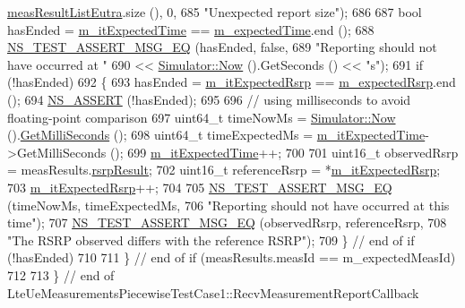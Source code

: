 \begin{DoxyCode}
      \hyperlink{structns3_1_1LteRrcSap_1_1MeasResults_a1fc2cdef154508dd522b46c71f854f03}{measResultListEutra}.size (), 0,
685                              \textcolor{stringliteral}{"Unexpected report size"});
686 
687       \textcolor{keywordtype}{bool} hasEnded = \hyperlink{classLteUeMeasurementsPiecewiseTestCase1_a6b6edd027bcc1219f66b88a318672dca}{m\_itExpectedTime} == \hyperlink{classLteUeMeasurementsPiecewiseTestCase1_a1906d2a638148579c52d6dcf370b84a2}{m\_expectedTime}.end ();
688       \hyperlink{group__testing_ga2a9d78cffb3db8e867c35fff0b698cf5}{NS\_TEST\_ASSERT\_MSG\_EQ} (hasEnded, \textcolor{keyword}{false},
689                              \textcolor{stringliteral}{"Reporting should not have occurred at "}
690                              << \hyperlink{group__simulator_gac3635e2e87f7ce316c89290ee1b01d0d}{Simulator::Now} ().GetSeconds () << \textcolor{stringliteral}{"s"});
691       \textcolor{keywordflow}{if} (!hasEnded)
692         \{
693           hasEnded = \hyperlink{classLteUeMeasurementsPiecewiseTestCase1_ad0362797e90952c7ffd619a9aa59309b}{m\_itExpectedRsrp} == \hyperlink{classLteUeMeasurementsPiecewiseTestCase1_abac81553dc6e6c5f9a0721a609647753}{m\_expectedRsrp}.end ();
694           \hyperlink{assert_8h_a6dccdb0de9b252f60088ce281c49d052}{NS\_ASSERT} (!hasEnded);
695 
696           \textcolor{comment}{// using milliseconds to avoid floating-point comparison}
697           uint64\_t timeNowMs = \hyperlink{group__simulator_gac3635e2e87f7ce316c89290ee1b01d0d}{Simulator::Now} ().\hyperlink{classns3_1_1Time_aba3428a8b6c4c8d9014ce44145081f34}{GetMilliSeconds} ();
698           uint64\_t timeExpectedMs = \hyperlink{classLteUeMeasurementsPiecewiseTestCase1_a6b6edd027bcc1219f66b88a318672dca}{m\_itExpectedTime}->GetMilliSeconds ();
699           \hyperlink{classLteUeMeasurementsPiecewiseTestCase1_a6b6edd027bcc1219f66b88a318672dca}{m\_itExpectedTime}++;
700 
701           uint16\_t observedRsrp = measResults.\hyperlink{structns3_1_1LteRrcSap_1_1MeasResults_a4d7bf8765525493fe5f5cccdbf94ab8b}{rsrpResult};
702           uint16\_t referenceRsrp = *\hyperlink{classLteUeMeasurementsPiecewiseTestCase1_ad0362797e90952c7ffd619a9aa59309b}{m\_itExpectedRsrp};
703           \hyperlink{classLteUeMeasurementsPiecewiseTestCase1_ad0362797e90952c7ffd619a9aa59309b}{m\_itExpectedRsrp}++;
704 
705           \hyperlink{group__testing_ga2a9d78cffb3db8e867c35fff0b698cf5}{NS\_TEST\_ASSERT\_MSG\_EQ} (timeNowMs, timeExpectedMs,
706                                  \textcolor{stringliteral}{"Reporting should not have occurred at this time"});
707           \hyperlink{group__testing_ga2a9d78cffb3db8e867c35fff0b698cf5}{NS\_TEST\_ASSERT\_MSG\_EQ} (observedRsrp, referenceRsrp,
708                                  \textcolor{stringliteral}{"The RSRP observed differs with the reference RSRP"});
709         \} \textcolor{comment}{// end of if (!hasEnded)}
710 
711     \} \textcolor{comment}{// end of if (measResults.measId == m\_expectedMeasId)}
712 
713 \} \textcolor{comment}{// end of LteUeMeasurementsPiecewiseTestCase1::RecvMeasurementReportCallback}
\end{DoxyCode}


